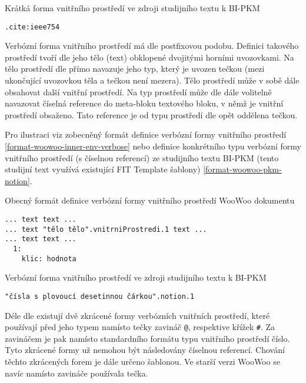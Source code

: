 \begin{listing}
    \caption{Krátká forma vnitřního prostředí ve zdroji studijního textu k BI-PKM \cite{pkm}}
    \label{format-woowoo-pkm-cite}
    \begin{verbatim}
.cite:ieee754
    \end{verbatim}
\end{listing}

Verbózní forma vnitřního prostředí má dle \cite{woowoo} postfixovou podobu. Definici takového prostředí tvoří dle
\cite{woowoo} jeho tělo (text) obklopené dvojitými horními uvozovkami. Na tělo prostředí dle \cite{woowoo} přímo
navazuje jeho typ, který je uvozen tečkou (mezi ukončující uvozovkou těla a tečkou není mezera). Tělo prostředí může
v sobě dále obsahovat další vnitřní prostředí. Na typ prostředí může dle \cite{woowoo} dále volitelně navazovat číselná
reference do meta-bloku textového bloku, v němž je vnitřní prostředí obsaženo. Tato reference je od typu prostředí dle
\cite{woowoo} opět oddělena tečkou.

Pro ilustraci viz zobecněný formát definice verbózní formy vnitřního prostředí \ref{format-woowoo-inner-env-verbose}
nebo definice konkrétního typu verbózní formy vnitřního prostředí (s číselnou referencí) ze studijního textu BI-PKM
(tento studijní text využívá existující FIT Template šablony) \ref{format-woowoo-pkm-notion}.

\begin{listing}
    \caption{Obecný formát definice verbózní formy vnitřního prostředí WooWoo dokumentu}
    \label{format-woowoo-inner-env-verbose}
    \begin{verbatim}
... text text ...
... text "tělo tělo".vnitrniProstredi.1 text ...
... text text ...
  1:
    klic: hodnota
    \end{verbatim}
\end{listing}

\begin{listing}
    \caption{Verbózní forma vnitřního prostředí ve zdroji studijního textu k BI-PKM \cite{pkm}}
    \label{format-woowoo-pkm-notion}
    \begin{verbatim}
"čísla s plovoucí desetinnou čárkou".notion.1
    \end{verbatim}
\end{listing}

Déle dle \cite{woowoo} existují dvě zkrácené formy verbózních vnitřních prostředí, které používají před jeho typem
namísto tečky zavináč \texttt{@}, respektive křížek \texttt{#}. Za zavináčem je pak namísto
standardního formátu typu vnitřního prostředí číslo. Tyto zkrácené formy už nemohou být následovány číselnou
referencí. Chování těchto zkrácených forem je dále určeno šablonou. Ve starší verzi WooWoo se navíc namísto zavináče
používala tečka.

